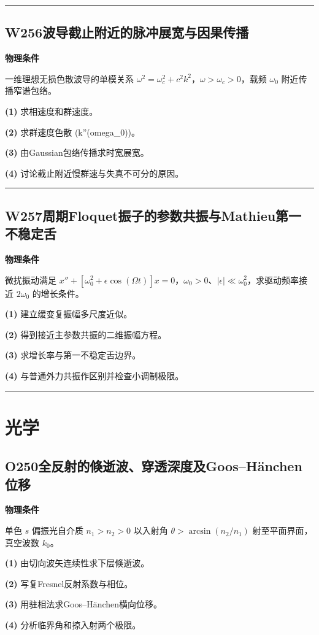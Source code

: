 \documentclass[UTF8,a4paper,11pt,oneside,openany]{ctexbook}
\begin{document}
\par\bigskip\hrule\bigskip
\section*{W256\quad 波导截止附近的脉冲展宽与因果传播}
\textbf{物理条件}\par 一维理想无损色散波导的单模关系 \(\omega^2=\omega_c^2+c^2k^2\)，\(\omega>\omega_c>0\)，载频 \(\omega_0\) 附近传播窄谱包络。
\par\noindent\textbf{(1)} 求相速度和群速度。
\par\noindent\textbf{(2)} 求群速度色散 (k''(omega\_0))。
\par\noindent\textbf{(3)} 由Gaussian包络传播求时宽展宽。
\par\noindent\textbf{(4)} 讨论截止附近慢群速与失真不可分的原因。

\par\bigskip\hrule\bigskip
\section*{W257\quad 周期Floquet振子的参数共振与Mathieu第一不稳定舌}
\textbf{物理条件}\par 微扰振动满足 \(x''+[\omega_0^2+\epsilon\cos(\Omega t)]x=0\)，\(\omega_0>0\)、\(|\epsilon|\ll\omega_0^2\)，求驱动频率接近 \(2\omega_0\) 的增长条件。
\par\noindent\textbf{(1)} 建立缓变复振幅多尺度近似。
\par\noindent\textbf{(2)} 得到接近主参数共振的二维振幅方程。
\par\noindent\textbf{(3)} 求增长率与第一不稳定舌边界。
\par\noindent\textbf{(4)} 与普通外力共振作区别并检查小调制极限。

\par\bigskip\hrule\bigskip
\chapter{光学}
\section*{O250\quad 全反射的倏逝波、穿透深度及Goos–Hänchen位移}
\textbf{物理条件}\par 单色 \(s\) 偏振光自介质 \(n_1>n_2>0\) 以入射角 \(\theta>\arcsin(n_2/n_1)\) 射至平面界面，真空波数 \(k_0\)。
\par\noindent\textbf{(1)} 由切向波矢连续性求下层倏逝波。
\par\noindent\textbf{(2)} 写复Fresnel反射系数与相位。
\par\noindent\textbf{(3)} 用驻相法求Goos–Hänchen横向位移。
\par\noindent\textbf{(4)} 分析临界角和掠入射两个极限。
\end{document}
